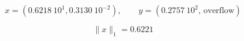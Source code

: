 \[ x=(0.6218\ 10^1,  0.3130\ 10^{-2}), \quad \quad  y=(0.2757\ 10^2, \, \mbox{overflow}) \]

\medskip
\[ \|x\|_1= 0.6221 \]
